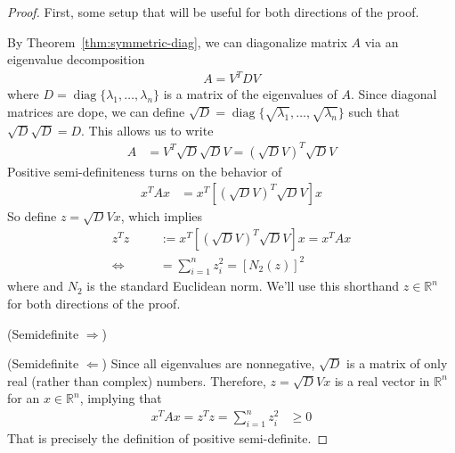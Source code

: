 \documentclass[12pt]{article}
\numberwithin{equation}{section} %
\theoremstyle{plain}
\theoremstyle{definition}
\theoremstyle{remark}
\newcommand{\diag}{\operatorname{diag}}
\newcommand{\R}{\mathbb{R}}
\newcommand{\Rn}{\mathbb{R}^n}
\begin{document}
\begin{proof}
First, some setup that will be useful for both directions of the proof.

By Theorem~\ref{thm:symmetric-diag}, we can diagonalize matrix $A$ via
an eigenvalue decomposition
\begin{align*}
  A = V^T D V
\end{align*}
where $D=\diag\{\lambda_1,\ldots,\lambda_n\}$ is a matrix of the
eigenvalues of $A$.  Since diagonal matrices are dope, we can define
$\sqrt{D}=\diag\{\sqrt{\lambda_1},\ldots,\sqrt{\lambda_n}\}$ such that
$\sqrt{D}\sqrt{D}=D$. This allows us to write
\begin{align*}
  A &= V^T \sqrt{D} \sqrt{D} V
  = \left(\sqrt{D} V\right)^T \sqrt{D} V
\end{align*}
Positive semi-definiteness turns on the behavior of
\begin{align*}
  x^T A x &=
  x^T  \left[\left(\sqrt{D} V\right)^T \sqrt{D} V\right] x
\end{align*}
So define $z = \sqrt{D}Vx$, which implies
\begin{align*}
  z^T z &:=x^T  \left[\left(\sqrt{D} V\right)^T \sqrt{D} V\right] x
  = x^T A x\\
  \Leftrightarrow \qquad
  &=  \sum^n_{i=1} z_i^2 = \left[N_2(z)\right]^2
\end{align*}
where and $N_2$ is the standard Euclidean norm. We'll
use this shorthand $z\in\Rn$ for both directions of the proof.

(Semidefinite $\Rightarrow$)




(Semidefinite $\Leftarrow$)
Since all eigenvalues are nonnegative, $\sqrt{D}$ is a matrix of only
real (rather than complex) numbers. Therefore, $z = \sqrt{D} Vx$ is a
real vector in $\Rn$ for an $x\in\Rn$, implying that
\begin{align*}
  x^T A x = z^T z =
  \sum^n_{i=1} z_i^2 &\geq 0
\end{align*}
That is precisely the definition of positive semi-definite.


\end{proof}
\end{document}
